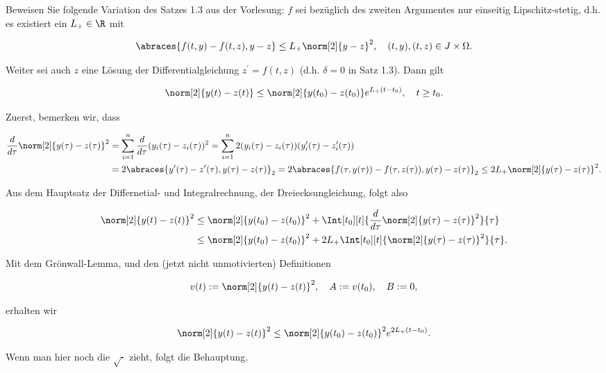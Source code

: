 \begin{exercise}

Beweisen Sie folgende Variation des Satzes 1.3 aus der Vorlesung:
$f$ sei bezüglich des zweiten Argumentes nur einseitig Lipschitz-stetig, d.h. es existiert ein $L_+ \in \R$ mit

\begin{align*}
  \abraces{f(t, y) - f(t, z), y - z}
  \leq
  L_+ \norm[2]{y - z}^2,
  \quad
  (t, y), (t, z) \in J \times \Omega.
\end{align*}

Weiter sei auch $z$ eine Lösung der Differentialgleichung $z^\prime = f(t, z)$ (d.h. $\delta = 0$ in Satz 1.3). Dann gilt

\begin{align*}
  \norm[2]{y(t) - z(t)}
  \leq
  \norm[2]{y(t_0) - z(t_0)} e^{L_+ (t - t_0)},
  \quad
  t \geq t_0.
\end{align*}

\end{exercise}

\begin{solution}

Zuerst, bemerken wir, dass

\begin{align*}
  \frac{d}{d \tau} \norm[2]{y(\tau) - z(\tau)}^2
  & =
  \sum_{i=1}^n \frac{d}{d \tau} (y_i(\tau) - z_i(\tau))^2
  =
  \sum_{i=1}^n 2 (y_i(\tau) - z_i(\tau))(y_i^\prime(\tau) - z_i^\prime(\tau)) \\
  & =
  2 \abraces
  {
    y^\prime(\tau) - z^\prime(\tau),
    y(\tau) - z(\tau)
  }_2
  =
  2 \abraces
  {
    f(\tau, y(\tau)) - f(\tau, z(\tau)),
    y(\tau) - z(\tau)
  }_2
  \leq
  2 L_+ \norm[2]{y(\tau) - z(\tau)}^2.
\end{align*}

Aus dem Hauptsatz der Differnetial- und Integralrechnung, der Dreiecksungleichung, folgt also

\begin{align*}
  \norm[2]{y(t) - z(t)}^2
  & \leq
  \norm[2]{y(t_0) - z(t_0)}^2
  +
  \Int[t_0][t]
  {\frac{d}{d \tau} \norm[2]{y(\tau) - z(\tau)}^2}{\tau} \\
  & \leq
  \norm[2]{y(t_0) - z(t_0)}^2
  +
  2 L_+ \Int[t_0][t]
  {\norm[2]{y(\tau) - z(\tau)}^2}{\tau}.
\end{align*}

Mit dem Grönwall-Lemma, und den (jetzt nicht unmotivierten) Definitionen

\begin{align*}
  v(t) := \norm[2]{y(t) - z(t)}^2,
  \quad
  A := v(t_0),
  \quad
  B := 0,
\end{align*}

erhalten wir

\begin{align*}
  \norm[2]{y(t) - z(t)}^{2}
  \leq
  \norm[2]{y(t_0) - z(t_0)}^2 e^{2 L_+ (t - t_0)}.
\end{align*}

Wenn man hier noch die $\sqrt{\cdot}$ zieht, folgt die Behauptung.

\end{solution}
